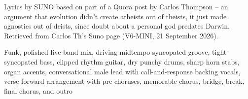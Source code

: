 
\begin{notes}
Lyrics by SUNO based on part of a Quora post by Carlos Thompson -- an argument that evolution didn't create atheists out of theists, it just made agnostics out of deists, since doubt about a personal god predates Darwin. Retrieved from Carlos Th's Suno page (V6-MINI, 21 September 2026).
\end{notes}
\begin{style}
Funk, polished live-band mix, driving midtempo syncopated groove, tight syncopated bass, clipped rhythm guitar, dry punchy drums, sharp horn stabs, organ accents, conversational male lead with call-and-response backing vocals, verse-forward arrangement with pre-choruses, memorable chorus, bridge, break, final chorus, and outro
\end{style}
